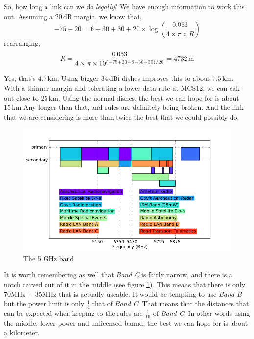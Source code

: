So, how long a link can we do \textit{legally}? We have enough
information to work this out. Assuming a $20\, \mathrm{dB}$ margin, we
know that,
$$
-75 + 20 = 6 + 30 + 30 + 20 \times
\log \left(\frac{0.053}{4 \times \pi \times R} \right)
$$
rearranging,
$$
R = \frac{%
  0.053
}{%
  4 \times \pi \times 10^{\left(-75 + 20 - 6 - 30 - 30\right)/20}%
} = 4732\, \mathrm{m}
$$

Yes, that's $4.7\, \mathrm{km}$. Using bigger $34\, \mathrm{dBi}$
dishes improves this to about $7.5\, \mathrm{km}$. With a thinner
margin and tolerating a lower data rate at MCS12, we can eak out close
to $25\, \mathrm{km}$. Using the normal dishes, the best we can hope
for is about $15\, \mathrm{km}$ Any longer than that, and rules are
definitely being broken. And the link that we are considering is more
than twice the best that we could possibly do.

\begin{figure}[h]
  \begin{center}
    \includegraphics[width=\textwidth]{spectrum.png}
  \end{center}
  \caption{The 5 GHz band}
  \label{fig:5GHz}
\end{figure}

It is worth remembering as well that \textit{Band C} is fairly narrow,
and there is a notch carved out of it in the middle (see figure
\ref{fig:5GHz}). This means that there is only 70MHz + 35MHz that is
actually useable. It would be tempting to use \textit{Band B} but the
power limit is only $\frac{1}{4}$ that of \textit{Band C}. That means
that the distances that can be expected when keeping to the rules are
$\frac{1}{16}$ of \textit{Band C}. In other words using the middle,
lower power and unlicensed bannd, the best we can hope for is about a
kilometer.

